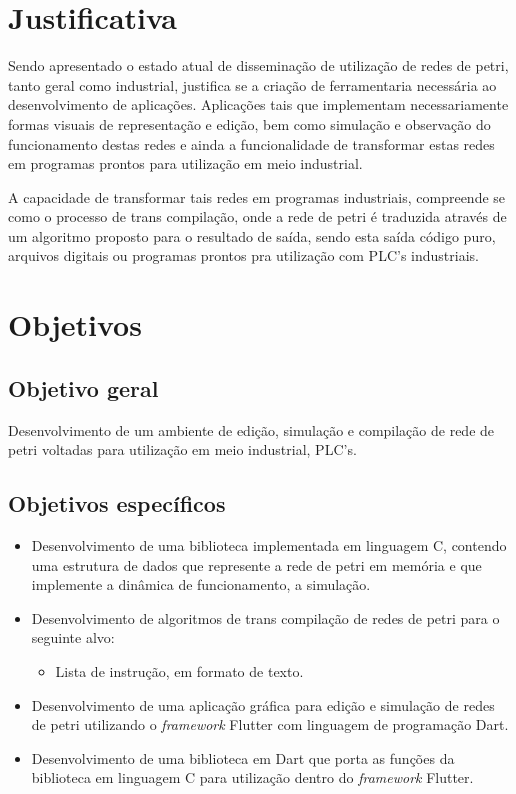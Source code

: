 \section{Justificativa}

Sendo apresentado o estado atual de disseminação de utilização de redes de petri, tanto geral como industrial, justifica se a criação de ferramentaria necessária ao desenvolvimento de aplicações. Aplicações tais que implementam necessariamente formas visuais de representação e edição, bem como simulação e observação do funcionamento destas redes e ainda a funcionalidade de transformar estas redes em programas prontos para utilização em meio industrial.

A capacidade de transformar tais redes em programas industriais, compreende se como o processo de trans compilação, onde a rede de petri é traduzida através de um algoritmo proposto para o resultado de saída, sendo esta saída código puro, arquivos digitais ou programas prontos pra utilização com PLC's industriais.

\section{Objetivos}

\subsection{Objetivo geral}

Desenvolvimento de um ambiente de edição, simulação e compilação de rede de petri voltadas para utilização em meio industrial, PLC's.

\subsection{Objetivos específicos}

\begin{itemize}
	\item Desenvolvimento de uma biblioteca implementada em linguagem C, contendo uma estrutura de dados que represente a rede de petri em memória e que implemente a dinâmica de funcionamento, a simulação.
	
	\item Desenvolvimento de algoritmos de trans compilação de redes de petri para o seguinte alvo:
	\begin{itemize}
		\item Lista de instrução, em formato de texto.
	\end{itemize}

	\item Desenvolvimento de uma aplicação gráfica para edição e simulação de redes de petri utilizando o \textit{framework} Flutter com linguagem de programação Dart.

	\item Desenvolvimento de uma biblioteca em Dart que porta as funções da biblioteca em linguagem C para utilização dentro do \textit{framework} Flutter.
\end{itemize}